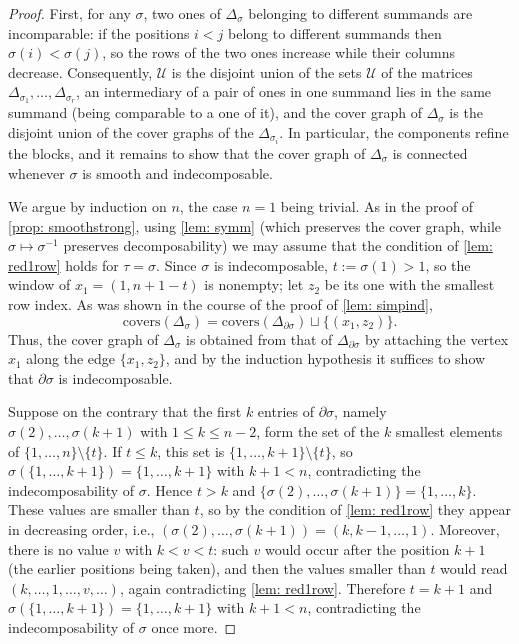 \documentclass[12pt]{article}
\newcommand{\U}{\mathcal{U}}
\newcommand{\IM}{\Delta}
\begin{document}
\begin{proof}
First, for any $\sigma$, two ones of $\IM_\sigma$ belonging to different summands are incomparable: if the
positions $i<j$ belong to different summands then $\sigma(i)<\sigma(j)$, so the rows of the two ones increase while
their columns decrease. Consequently, $\U$ is the disjoint union of the sets $\U$ of the matrices
$\IM_{\sigma_1},\dots,\IM_{\sigma_r}$, an intermediary of a pair of ones in one summand lies in the same summand
(being comparable to a one of it), and the cover graph of $\IM_\sigma$ is the disjoint union of the cover graphs of
the $\IM_{\sigma_i}$. In particular, the components refine the blocks, and it remains to show that the cover graph
of $\IM_\sigma$ is connected whenever $\sigma$ is smooth and indecomposable.

We argue by induction on $n$, the case $n=1$ being trivial. As in the proof of \cref{prop: smoothstrong}, using \cref{lem: symm} (which preserves the cover graph, while
$\sigma\mapsto\sigma^{-1}$ preserves decomposability) we may assume that the condition of \cref{lem: red1row}
holds for $\tau=\sigma$. Since $\sigma$ is indecomposable, $t:=\sigma(1)>1$, so the window of $x_1=(1,n+1-t)$ is
nonempty; let $z_2$ be its one with the smallest row index. As was shown in the course of the proof of \cref{lem: simpind},
\[
\text{covers}(\IM_\sigma)=\text{covers}(\IM_{\partial\sigma})\sqcup\{(x_1,z_2)\}.
\]
Thus, the cover graph of $\IM_\sigma$ is obtained from that of $\IM_{\partial\sigma}$ by attaching the vertex $x_1$
along the edge $\{x_1,z_2\}$, and by the induction hypothesis it suffices to show that $\partial\sigma$ is
indecomposable.

Suppose on the contrary that the first $k$ entries of $\partial\sigma$, namely $\sigma(2),\dots,\sigma(k+1)$ with
$1\le k\le n-2$, form the set of the $k$ smallest elements of $\{1,\dots,n\}\setminus\{t\}$. If $t\le k$, this set
is $\{1,\dots,k+1\}\setminus\{t\}$, so $\sigma(\{1,\dots,k+1\})=\{1,\dots,k+1\}$ with $k+1<n$, contradicting the
indecomposability of $\sigma$. Hence $t>k$ and $\{\sigma(2),\dots,\sigma(k+1)\}=\{1,\dots,k\}$. These values are
smaller than $t$, so by the condition of \cref{lem: red1row} they appear in decreasing order, i.e.,
$(\sigma(2),\dots,\sigma(k+1))=(k,k-1,\dots,1)$. Moreover, there is no value $v$ with $k<v<t$: such $v$ would occur
after the position $k+1$ (the earlier positions being taken), and then the values smaller than $t$ would read
$(k,\dots,1,\dots,v,\dots)$, again contradicting \cref{lem: red1row}. Therefore $t=k+1$ and
$\sigma(\{1,\dots,k+1\})=\{1,\dots,k+1\}$ with $k+1<n$, contradicting the indecomposability of $\sigma$ once more.
\end{proof}
\end{document}
